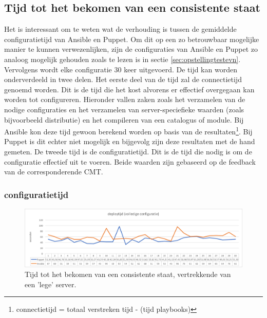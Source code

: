 \subsection{Tijd tot het bekomen van een consistente staat}

Het is interessant om te weten wat de verhouding is tussen de gemiddelde \gls{configuratietijd} van Ansible en Puppet. Om dit op een zo betrouwbaar mogelijke manier te kunnen verwezenlijken, zijn de configuraties van Ansible en Puppet zo analoog mogelijk gehouden zoals te lezen is in sectie \ref{sec:opstellingtestevn}. Vervolgens wordt elke configuratie 30 keer uitgevoerd. De tijd kan worden onderverdeeld in twee delen.\newline
Het eerste deel van de tijd zal de \gls{connectietijd} genoemd worden. Dit is de tijd die het kost alvorens er effectief overgegaan kan worden tot configureren. Hieronder vallen zaken zoals het verzamelen van de nodige configuraties en het verzamelen van server-speciefieke waarden (zoals bijvoorbeeld distributie) en het compileren van een catalogus of module. Bij Ansible kon deze tijd gewoon berekend worden op basis van de resultaten\footnote{connectietijd = totaal verstreken tijd -  \unexpanded{$ \sum  $} (tijd playbooks)}. Bij Puppet is dit echter niet mogelijk en bijgevolg zijn deze resultaten met de hand gemeten.\newline
 De tweede tijd is de \gls{configuratietijd}. Dit is de tijd die nodig is om de configuratie effectief uit te voeren. Beide waarden zijn gebaseerd op de feedback van de corresponderende \gls{CMT}.




\subsubsection{\gls{configuratietijd}}
\begin{figure}
  \includegraphics[width=\linewidth]{img/deploytime_fullconfig.png} 
  \caption{Tijd tot het bekomen van een consistente staat, vertrekkende van een 'lege' server.}  
  \label{fig:deploytime_fullconfig}
\end{figure}




